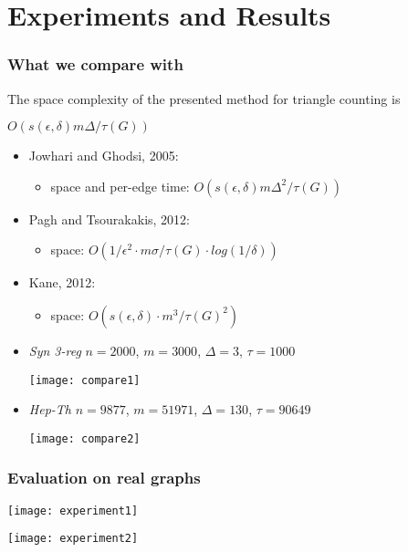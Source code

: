 \documentclass[11pt]{beamer}
\begin{document}
\section{Experiments and Results}
\begin{frame}
\frametitle{What we compare with}
The space complexity of the presented method for triangle counting is 
\begin{center}
$O(s(\epsilon, \delta)m\Delta/\tau(G))$
\begin{itemize}
\item Jowhari and Ghodsi, 2005:
\begin{itemize}
\item space and per-edge time: $O(s(\epsilon,\delta)m\Delta^2/\tau(G))$
\end{itemize}
\item Pagh and Tsourakakis, 2012: 
\begin{itemize}
\item space: $O(1/\epsilon^2\cdot m\sigma/\tau(G)\cdot log(1/\delta))$
\end{itemize}
\item Kane, 2012:
\begin{itemize}
\item space: $O(s(\epsilon, \delta)\cdot m^3/\tau(G)^2)$
\end{itemize}
\end{itemize}
\end{center}
\end{frame}

\begin{frame}

\begin{itemize}
\item \textit{Syn 3-reg} $n=2000$, $m=3000$, $\Delta=3$, $\tau=1000$
\vspace{0.3cm}
\begin{center}
\texttt{[image: compare1]}
\end{center}
\item \textit{Hep-Th} $n=9877$, $m=51971$, $\Delta=130$, $\tau=90649$
\vspace{0.3cm}
\begin{center}
\texttt{[image: compare2]}
\end{center}
\end{itemize}
\end{frame}

\begin{frame}
\frametitle{Evaluation on real graphs}
\texttt{[image: experiment1]}
\begin{center}
\texttt{[image: experiment2]}
\end{center}
\end{frame}
\end{document}
